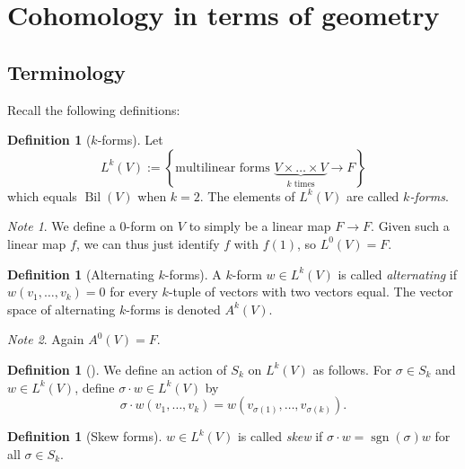 \documentclass[reqno]{amsart}
\theoremstyle{definition}
\newtheorem{definition}[theorem]{Definition}
\theoremstyle{remark}
\newtheorem*{note}{Note}
\DeclareMathOperator{\sgn}{sgn}
\DeclareMathOperator{\Bil}{Bil}
\begin{document}
     \section{Cohomology in terms of geometry}

     \subsection{Terminology}


     Recall the following definitions:

     \begin{definition}[$k$-forms]
         Let
         \[
         L^{k}(V) := 
         \left\{ \text{multilinear forms }
         \underbrace{V \times \ldots \times V}_{k \text{ times}}
     \to F \right\} 
         \] 
         which equals $\Bil (V)$ when $k = 2$.
         The elements of $L^{k}(V)$ are called
         \textit{$k$-forms}.
     \end{definition}

     \begin{note}
         We define a $0$-form
         on $V$ to simply be a linear map
         $F \to F$. Given such a linear map
         $f$, we can thus just
         identify $f$ with
         $f(1)$, so
         $L^{0}(V) = F$.
     \end{note}

     \begin{definition}[Alternating $k$-forms]
         A $k$-form $w \in L^{k}(V)$ is called
         \textit{alternating} if $w\left( v_1,\ldots,
         v_k\right) = 0$ for every $k$-tuple of vectors
         with two vectors equal.
         The vector space of alternating $k$-forms
         is denoted
         $A^{k}(V)$.
     \end{definition}

     \begin{note}
         Again $A^{0}(V) = F$.
     \end{note}

     \begin{definition}[]
         We define an action
         of $S_k$ on $L^{k}(V)$ as follows.
         For $\sigma \in S_k$ and $w \in L^{k}(V)$, define
         $\sigma \cdot w \in L^{k}(V)$ by
         \[
         \sigma \cdot w\left( v_1, \ldots, v_k \right) 
         = 
         w \left( v_{\sigma (1)},\ldots,
         v_{\sigma (k)}\right) .
         \] 
     \end{definition}

     \begin{definition}[Skew forms]
         $w \in L^{k}(V)$ is called
         \textit{skew} if $\sigma \cdot w = 
         \sgn (\sigma) w$ for all
         $\sigma \in S_k$.
     \end{definition}
\end{document}
